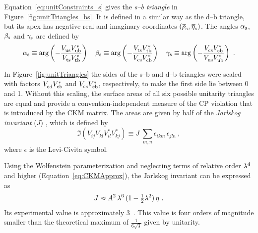Equation~\ref{eq:unitConstraints_s} gives the \emph{s--b triangle} in Figure~\ref{fig:unitTriangles_bs}. It is defined in a
similar way as the d--b triangle, but its apex has negative real and imaginary coordinates $(\rhosbar, \etasbar)$. The angles $\alpha_\text{s}$, $\beta_\text{s}$
and $\gamma_\text{s}$ are defined by
\begin{equation}
  \label{eq:bsAnglesDef}
  \as \equiv \arg\left( -\frac{\Vus\Vub[*]}{\Vts\Vtb[*]} \right)
  \quad
  \bs \equiv \arg\left( -\frac{\Vts\Vtb[*]}{\Vcs\Vcb[*]} \right)
  \quad
  \gs \equiv \arg\left( -\frac{\Vcs\Vcb[*]}{\Vus\Vub[*]} \right)
  \ .
\end{equation}

In Figure~\ref{fig:unitTriangles} the sides of the s--b and d--b triangles were scaled with factors $\Vcd\Vcb[*]$ and $\Vcs\Vcb[*]$,
respectively, to make the first side lie between 0 and 1. Without this scaling, the surface areas of all six possible unitarity triangles
are equal and provide a convention-independent measure of the CP violation that is introduced by the CKM matrix. The areas are given by
half of the \emph{Jarlskog invariant} ($J$) \cite{Jarlskog:1985ht}, which is defined by
\begin{equation}
  \Im( V^{\phantom{*}}_{ij} V^{\phantom{*}}_{kl} V^{*}_{il} V^{*}_{kj} ) \equiv J\; \sum_{m,n} \epsilon_{ikm}\,\epsilon_{jln}
  \ ,
\end{equation}
where $\epsilon$ is the Levi-Civita symbol.

Using the Wolfenstein parameterization and neglecting terms of relative order $\lambda^4$ and higher (Equation~\ref{eq:CKMApprox}), the
Jarlskog invariant can be expressed as
\begin{equation}
  J \approx A^2\, \lambda^6\, (1-\tfrac{1}{2}\lambda^2)\, \eta
  \ .
\end{equation}
Its experimental value is approximately 3~\cite{Charles:2004jd,Bona:2005vz}. This value is four orders of magnitude smaller
than the theoretical maximum of $\frac{\text{1}}{\text{6}\sqrt{\text{3}}}$ given by unitarity.

